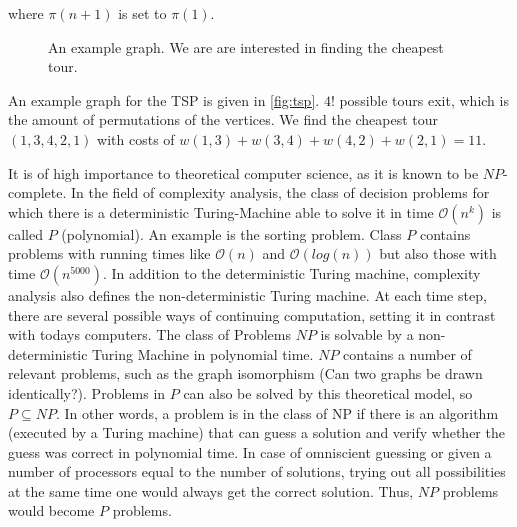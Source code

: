 \documentclass[10pt,a4paper,DIV=11]{scrreprt}
\begin{document}
where $\pi(n+1)$ is set to $\pi(1)$.\cite{MATHINF}\\

\begin{figure}[H]
\centering
\caption{An example graph. We are are interested in finding the cheapest tour.\cite{MATHINF}}
\label{fig:feedback}
\end{figure}

An example graph for the TSP is given in \ref{fig:tsp}. $4!$ possible tours exit, which is the amount of permutations of the vertices.
We find the cheapest tour $(1, 3, 4, 2, 1)$ with costs of $w(1, 3) + w(3, 4) + w(4, 2) + w(2, 1) = 11$.

It is of high importance to theoretical computer science, as it is known to be $NP$-complete. In the field of complexity analysis, the class of decision problems for which there is a deterministic Turing-Machine able to solve it in time $\mathcal{O}(n^k)$ is called $P$ (polynomial). An example is the sorting problem. Class $P$ contains problems with running times like $\mathcal{O}(n)$ and $\mathcal{O}(log(n))$ but also those with time $\mathcal{O}(n^{5000})$. In addition to the deterministic Turing machine, complexity analysis also defines the non-deterministic Turing machine. At each time step, there are several possible ways of continuing computation, setting it in contrast with todays computers. The class of Problems $NP$ is solvable by a non-deterministic Turing Machine in polynomial time. $NP$ contains a number of relevant problems, such as the graph isomorphism (Can two graphs be drawn identically?). Problems in $P$ can also be solved by this theoretical model, so $P \subseteq NP$. In other words, a problem is in the class of NP if there is an algorithm (executed by a Turing machine) that can guess a solution and verify whether the guess was correct in polynomial time. In case of omniscient guessing or given a number of processors equal to the number of solutions, trying out all possibilities at the same time one would always get the correct solution. Thus, $NP$ problems would become $P$ problems. 
\end{document}
